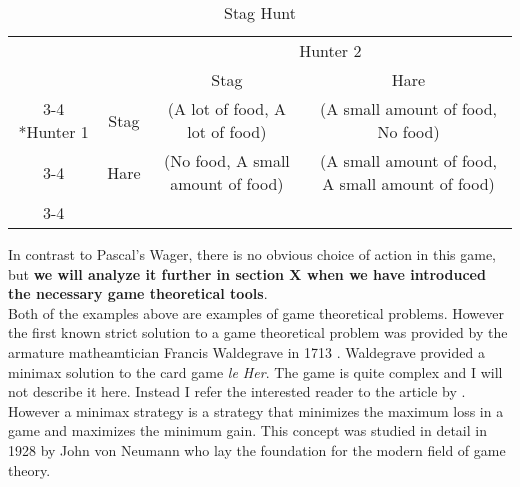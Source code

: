 \documentclass{article}
\newcommand*{\mtodo}[1]{\todo[color=violet!50]{Mikael: #1}}
\theoremstyle{definition}
\theoremstyle{remark}
\begin{document}
\begin{table}[h!]
  \centering
  \setlength{\extrarowheight}{2pt}
  \begin{tabular}{cc|c|c|}
    & \multicolumn{1}{c}{} & \multicolumn{2}{c}{Hunter 2}\\
    & \multicolumn{1}{c}{} & \multicolumn{1}{c}{Stag}  &
                                                              \multicolumn{1}{c}{Hare}
    \\\cline{3-4}
\multirow{2}*{Hunter 1}  & Stag & (A lot of food, A lot of food) &
                                                                   (A small amount
                                        of food,
                                                                   No food) \\\cline{3-4}
    & Hare & (No food, A small amount
                                        of food) & (A small amount
                                        of food, A small amount
                                        of food) \\\cline{3-4}
  \end{tabular}
  \caption{Stag Hunt}
  \label{Stag hunt 1}
\end{table}

In contrast to Pascal's Wager, there is no obvious choice of action in
this game, but \textbf{we will analyze it further in section X when we
  have introduced the necessary game theoretical tools}.\\

Both of the examples above are examples of game theoretical
problems. However the first known strict solution to a game theoretical
problem was provided by the armature matheamtician Francis Waldegrave
in 1713 \citep{Fillion2015}. Waldegrave provided a minimax solution to
the card game \emph{le Her}. The game is quite complex and I
will not describe it here. Instead I refer the interested reader to
the article by \cite{Fillion2015}. However a minimax strategy is a
\mtodo{This is wrong.}
strategy that minimizes the maximum loss in a game and maximizes the
minimum gain. This concept was studied in detail in 1928 by John von
Neumann who lay the foundation for the modern field of game theory.\\
\end{document}
